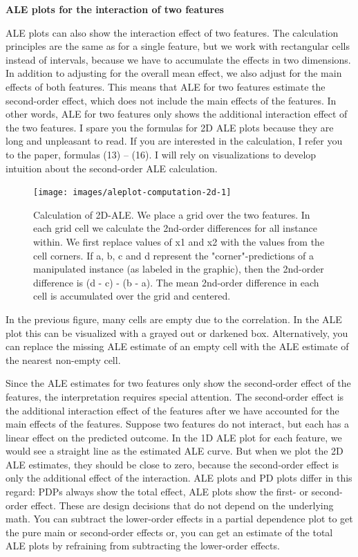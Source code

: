 \documentclass[
  12pt,
]{krantz}
\begin{document}
\textbf{ALE plots for the interaction of two features}

ALE plots can also show the interaction effect of two features.
The calculation principles are the same as for a single feature, but we work with rectangular cells instead of intervals, because we have to accumulate the effects in two dimensions.
In addition to adjusting for the overall mean effect, we also adjust for the main effects of both features.
This means that ALE for two features estimate the second-order effect, which does not include the main effects of the features.
In other words, ALE for two features only shows the additional interaction effect of the two features.
I spare you the formulas for 2D ALE plots because they are long and unpleasant to read.
If you are interested in the calculation, I refer you to the paper, formulas (13) -- (16).
I will rely on visualizations to develop intuition about the second-order ALE calculation.

\begin{figure}

{\centering \texttt{[image: images/aleplot-computation-2d-1]} 

}

\caption{Calculation of 2D-ALE. We place a grid over the two features. In each grid cell we calculate the 2nd-order differences for all instance within. We first replace values of x1 and x2 with the values from the cell corners. If a, b, c and d represent the "corner"-predictions of a manipulated instance (as labeled in the graphic), then the 2nd-order difference is (d - c) - (b - a). The mean 2nd-order difference in each cell is accumulated over the grid and centered.}\label{fig:aleplot-computation-2d}
\end{figure}

In the previous figure, many cells are empty due to the correlation.
In the ALE plot this can be visualized with a grayed out or darkened box.
Alternatively, you can replace the missing ALE estimate of an empty cell with the ALE estimate of the nearest non-empty cell.

Since the ALE estimates for two features only show the second-order effect of the features, the interpretation requires special attention.
The second-order effect is the additional interaction effect of the features after we have accounted for the main effects of the features.
Suppose two features do not interact, but each has a linear effect on the predicted outcome.
In the 1D ALE plot for each feature, we would see a straight line as the estimated ALE curve.
But when we plot the 2D ALE estimates, they should be close to zero, because the second-order effect is only the additional effect of the interaction.
ALE plots and PD plots differ in this regard:
PDPs always show the total effect, ALE plots show the first- or second-order effect.
These are design decisions that do not depend on the underlying math.
You can subtract the lower-order effects in a partial dependence plot to get the pure main or second-order effects or, you can get an estimate of the total ALE plots by refraining from subtracting the lower-order effects.
\end{document}
